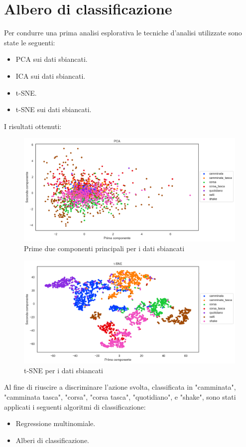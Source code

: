 \documentclass[./main.tex]{subfiles}
\begin{document}
\section{Albero di classificazione}
Per condurre una prima analisi esplorativa le tecniche d'analisi utilizzate sono state le seguenti:
\begin{itemize}
	\item PCA sui dati sbiancati.
	\item ICA sui dati sbiancati.
	\item t-SNE.
	\item t-SNE sui dati sbiancati.
\end{itemize}
I risultati ottenuti:
\begin{figure}[H]
	\centering
	\includegraphics[width=.99\textwidth, keepaspectratio]{../../figure/PCA.png}
	\caption{{ Prime due componenti principali per i dati sbiancati}}
	\label{PCA}
\end{figure}


\begin{figure}[H]
	\centering
	\includegraphics[width=.99\textwidth, keepaspectratio]{../../figure/t-SNE.png}
	\caption{{ t-SNE per i dati sbiancati}}
	\label{tSNE}
\end{figure}
Al fine di riuscire a discriminare l'azione svolta, classificata in "camminata", "camminata tasca", "corsa", "corsa tasca", "quotidiano", e "shake", sono stati applicati i seguenti algoritmi di classificazione:
\begin{itemize}
	\item Regressione multinomiale.
	\item Alberi di classificazione.
\end{itemize}
\end{document}
